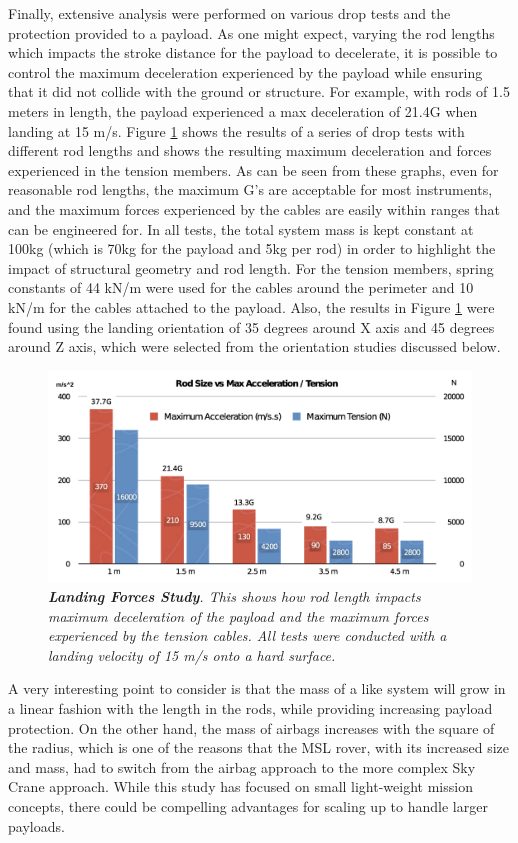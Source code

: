 Finally, extensive analysis were performed on  various drop tests and the protection provided to a payload.   As one might expect, varying the rod lengths which impacts the stroke distance for the payload to decelerate, it is possible to control the maximum deceleration experienced by the payload while ensuring that it did not collide with the ground or structure.  For example, with rods of 1.5 meters in length, the payload experienced a max deceleration of 21.4G when landing at 15 m/s. Figure \ref{fig:rodvsG} shows the results of a series of drop tests with different rod lengths and shows the resulting maximum deceleration and forces experienced in the tension members.   As can be seen from these graphs, even for reasonable rod lengths, the maximum G's are acceptable for most instruments, and the maximum forces experienced by the cables are easily within ranges that can be engineered for.  In all tests, the total system mass is kept constant at 100kg (which is 70kg for the payload and 5kg per rod) in order to highlight the impact of structural geometry and rod length.  For the tension members, spring constants of 44 kN/m were used for the cables around the perimeter and 10 kN/m for the cables attached to the payload.  Also, the results in Figure \ref{fig:rodvsG} were found using the landing orientation of 35 degrees around X axis and 45 degrees around Z axis, which were selected from the orientation studies discussed below. 

\begin{figure}[htbp]
\centering
\includegraphics[width=0.8\columnwidth]{tex/images/rodvsG_fixed2}
\caption{{\em {\bf Landing Forces Study}. This shows how rod length impacts maximum deceleration of the payload and  the maximum forces experienced by the tension cables.  All tests were conducted with a landing velocity of 15 m/s onto a hard surface.}}
\label{fig:rodvsG}
\end{figure}

A very interesting point to consider is that the mass of a \SB{} like system will grow in a linear fashion with the length in the rods, while providing increasing payload protection.  On the other hand, the mass of airbags increases with the square of the radius, which is one of the reasons that the MSL rover, with its increased size and mass, had to switch from the airbag approach to the more complex Sky Crane approach.  While this study has focused on small light-weight mission concepts, there could be compelling advantages for scaling up to handle larger payloads.

